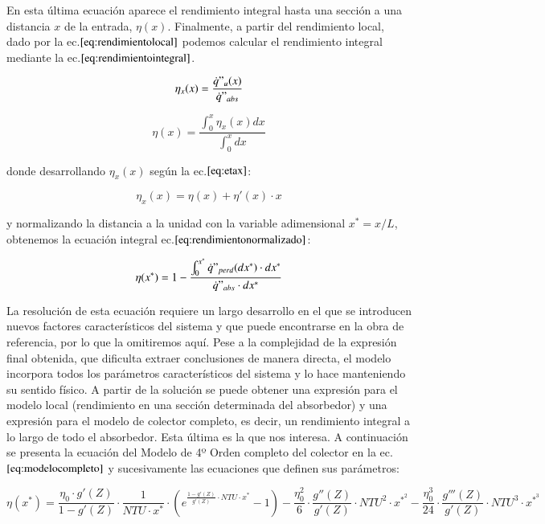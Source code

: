 En esta última ecuación aparece el rendimiento integral hasta una sección a una distancia \(x\) de la entrada, \(\eta(x)\). Finalmente, a partir del rendimiento local, dado por la ec.\(\eqref{eq:rendimientolocal}\) podemos calcular el rendimiento integral mediante la ec.\(\eqref{eq:rendimientointegral}\).

\begin{equation}
    \eta_{x}(x) = \frac{\dot{q}"_{u}(x)}{\dot{q}"_{abs}} \label{eq:rendimientolocal}
\end{equation}

\begin{equation}
    \eta(x) = \frac{\int_{0}^{x}\eta_{x}(x)dx}{\int_{0}^{x}dx} \label{eq:rendimientointegral}
\end{equation}

donde desarrollando \(\eta_{x}(x)\) según la ec.\(\eqref{eq:etax}\):

\begin{equation}
    \eta_{x}(x) = \eta(x) + \eta'(x)\cdot x  \label{eq:etax}
\end{equation}

y normalizando la distancia a la unidad con la variable adimensional \(x^{*}=x/L\), obtenemos la ecuación integral ec.\(\eqref{eq:rendimientonormalizado}\):

\begin{equation}
    \eta(x^{*}) = 1 - \frac{\int_{0}^{x^{*}} \dot{q}"_{perd}(dx^{*})\cdot dx^{*}}{\dot{q}"_{abs}\cdot dx^{*}} \label{eq:rendimientonormalizado}
\end{equation}

La resolución de esta ecuación requiere un largo desarrollo en el que se introducen nuevos factores característicos del sistema y que puede encontrarse en la obra de referencia, por lo que la omitiremos aquí. Pese a la complejidad de la expresión final obtenida, que dificulta extraer conclusiones de manera directa, el modelo incorpora todos los parámetros característicos del sistema y lo hace manteniendo su sentido físico. A partir de la solución se puede obtener una expresión para el modelo local (rendimiento en una sección determinada del absorbedor) y una expresión para el modelo de colector completo, es decir, un rendimiento integral a lo largo de todo el absorbedor. Esta última es la que nos interesa. A continuación se presenta la ecuación del Modelo de 4º Orden completo del colector en la ec.\(\eqref{eq:modelocompleto}\) y sucesivamente las ecuaciones que definen sus parámetros:

\begin{equation}
    \eta(x^{*}) = \frac{\eta_{0} \cdot g'(Z)}{1-g'(Z)} \cdot \frac{1}{NTU \cdot x^{*}} \cdot \left(e^{\frac{1-g'(Z)}{g'(Z)}\cdot NTU \cdot x^{*}} - 1\right) - \frac{\eta_{0}^2}{6} \cdot \frac{g''(Z)}{g'(Z)} \cdot NTU^{2} \cdot x^{*^{2}} - \frac{\eta_{0}^{3}}{24} \cdot \frac{g'''(Z)}{g'(Z)} \cdot NTU^{3} \cdot x^{*^{3}}
    \label{eq:modelocompleto}
\end{equation}

